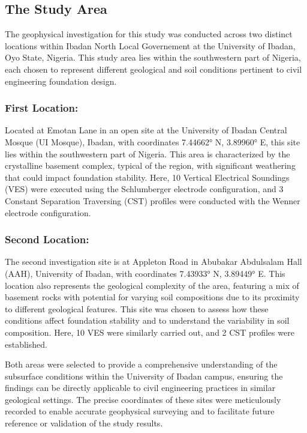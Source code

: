\documentclass[12pt,a4paper]{report}
\begin{document}
\subsection{The Study Area}

The geophysical investigation for this study was conducted across two distinct locations within Ibadan North Local Governement at the University of Ibadan, Oyo State, Nigeria. This study area lies within the southwestern part of Nigeria, each chosen to represent different geological and soil conditions pertinent to civil engineering foundation design.

\subsubsection{\textbf{First Location:}}
Located at Emotan Lane in an open site at the University of Ibadan Central Mosque (UI Mosque), Ibadan, with coordinates 7.44662° N, 3.89960° E, this site lies within the southwestern part of Nigeria. This area is characterized by the crystalline basement complex, typical of the region, with significant weathering that could impact foundation stability. Here, 10 Vertical Electrical Soundings (VES) were executed using the Schlumberger electrode configuration, and 3 Constant Separation Traversing (CST) profiles were conducted with the Wenner electrode configuration.

\subsubsection{\textbf{Second Location:}}
The second investigation site is at Appleton Road in Abubakar Abdulsalam Hall (AAH), University of Ibadan, with coordinates 7.43933° N, 3.89449° E. This location also represents the geological complexity of the area, featuring a mix of basement rocks with potential for varying soil compositions due to its proximity to different geological features. This site was chosen to assess how these conditions affect foundation stability and to understand the variability in soil composition. Here, 10 VES were similarly carried out, and 2 CST profiles were established.

Both areas were selected to provide a comprehensive understanding of the subsurface conditions within the University of Ibadan campus, ensuring the findings can be directly applicable to civil engineering practices in similar geological settings. The precise coordinates of these sites were meticulously recorded to enable accurate geophysical surveying and to facilitate future reference or validation of the study results.
\end{document}
